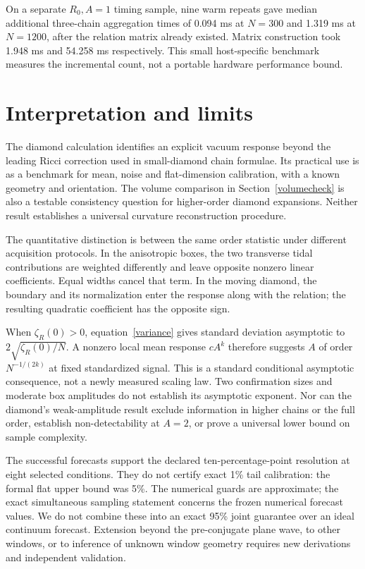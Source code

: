 \documentclass[11pt,a4paper]{article}
\begin{document}
On a separate $R_0,A=1$ timing sample, nine warm repeats gave median additional
three-chain aggregation times of 0.094 ms at $N=300$ and 1.319 ms at $N=1200$,
after the relation matrix already existed. Matrix construction took 1.948 ms
and 54.258 ms respectively. This small host-specific benchmark measures the
incremental count, not a portable hardware performance bound.

\section{Interpretation and limits}
The diamond calculation identifies an explicit vacuum response beyond the
leading Ricci correction used in small-diamond chain formulae. Its practical
use is as a benchmark for mean, noise and flat-dimension calibration, with a
known geometry and orientation. The volume comparison in Section~\ref{volumecheck}
is also a testable consistency question for higher-order diamond expansions.
Neither result establishes a universal curvature reconstruction procedure.

The quantitative distinction is between the same order statistic under
different acquisition protocols. In the anisotropic boxes, the two transverse
tidal contributions are weighted differently and leave opposite nonzero linear
coefficients. Equal widths cancel that term. In the moving diamond, the
boundary and its normalization enter the response along with the relation;
the resulting quadratic coefficient has the opposite sign.

When $\zeta_R(0)>0$, equation~\eqref{variance} gives standard deviation
asymptotic to $2\sqrt{\zeta_R(0)/N}$. A nonzero local mean response $cA^k$
therefore suggests $A$ of order $N^{-1/(2k)}$ at fixed standardized signal.
This is a standard conditional asymptotic consequence, not a newly measured
scaling law. Two confirmation sizes and moderate box amplitudes do not establish
its asymptotic exponent. Nor can the diamond's weak-amplitude result exclude
information in higher chains or the full order, establish non-detectability
at $A=2$, or prove a universal lower bound on sample complexity.

The successful forecasts support the declared ten-percentage-point resolution
at eight selected conditions. They do not certify exact 1\% tail calibration:
the formal flat upper bound was 5\%. The numerical guards are approximate;
the exact simultaneous sampling statement concerns the frozen numerical
forecast values. We do not combine these into an exact 95\% joint guarantee
over an ideal continuum forecast. Extension beyond the pre-conjugate plane
wave, to other windows, or to inference of unknown window geometry requires
new derivations and independent validation.
\end{document}
